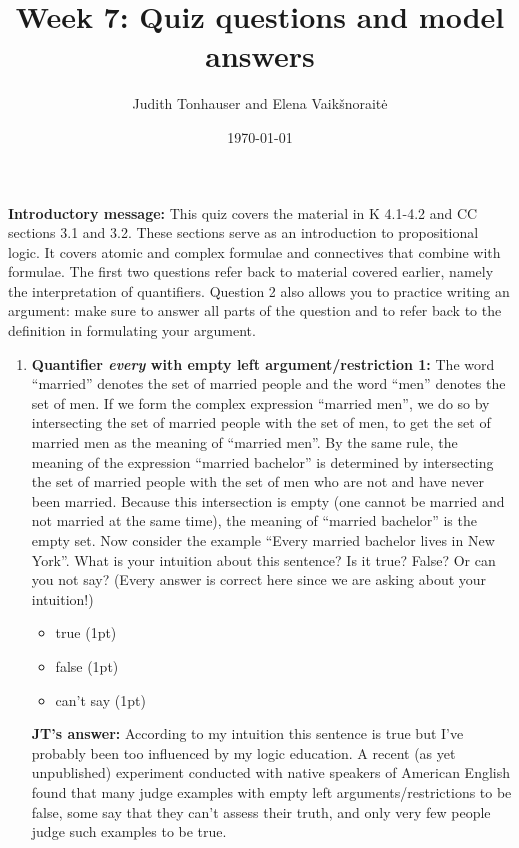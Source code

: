 \documentclass[a4,11pt]{article}
\title{Week 7: Quiz questions and model answers}
\author{Judith Tonhauser and Elena Vaik\v snorait\.{e} }
\date{\today}
\newcommand{\6}{\mbox{$[\hspace*{-.6mm}[$}}
\newcommand{\9}{\mbox{$]\hspace*{-.6mm}]$}}
\begin{document}
\maketitle

{\bf Introductory message:} This quiz covers the material in K 4.1-4.2 and CC sections 3.1 and 3.2. These sections serve as an introduction to propositional logic. It covers atomic and complex formulae and connectives that combine with formulae. The first two questions refer back to material covered earlier, namely the interpretation of quantifiers. Question 2 also allows you to practice writing an argument: make sure to answer all parts of the question and to refer back to the definition in formulating your argument.

\begin{enumerate}[leftmargin = 12pt]

\item {\bf Quantifier {\em every} with empty left argument/restriction 1:}  The word ``married'' denotes the set of married people and the word ``men'' denotes the set of men. If we form the complex expression ``married men'', we do so by intersecting the set of married people with the set of men, to get the set of married men as the meaning of ``married men''. By the same rule, the meaning of the expression ``married bachelor'' is determined by intersecting the set of married people with the set of men who are not and have never been married. Because this intersection is empty (one cannot be married and not married at the same time), the meaning of ``married bachelor'' is the empty set. Now consider the example ``Every married bachelor lives in New York''. What is your intuition about this sentence? Is it true? False? Or can you not say? (Every answer is correct here since we are asking about your intuition!)

\begin{itemize}[noitemsep]
\item true (1pt)
\item false (1pt)
\item can't say (1pt)
\end{itemize}

{\bf JT's answer:} According to my intuition this sentence is true but I've probably been too influenced by my logic education. A recent (as yet unpublished) experiment conducted with native speakers of American English found that many judge examples with empty left arguments/restrictions to be false, some say that they can't assess their truth, and only very few people judge such examples to be true.


\end{enumerate}
\end{document}
